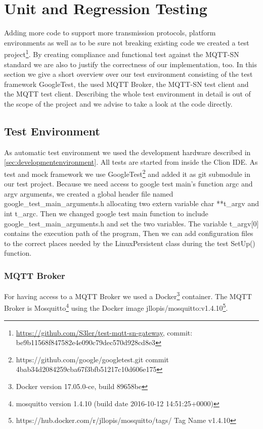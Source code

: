 \section{Unit and Regression Testing}\label{sec:unitandregressiontesting}
Adding more code to support more transmission protocols, platform environments as well as to be sure not breaking existing code we created a test project\footnote{\url{https://github.com/S3ler/test-mqtt-sn-gateway}, commit: be9b11568f847582e4e090c79dec570d928cd8e3}. By creating compliance and functional test against the MQTT-SN standard we are also to justify the correctness of our implementation, too.
In this section we give a short overview over our test environment consisting of the test framework GoogleTest, the used MQTT Broker, the MQTT-SN test client and the MQTT test client.
Describing the whole test environment in detail is out of the scope of the project and we advise to take a look at the code directly.
\subsection{Test Environment}\label{sec:testenvironment}
As automatic test environment we used the development hardware described in \autoref{sec:developmentenvironment}.
All tests are started from inside the Clion IDE.
As test and mock framework we use GoogleTest\footnote{https://github.com/google/googletest.git commit 4bab34d2084259cba67f3bfb51217c10d606e175} and added it as git submodule in our test project.
Because we need access to google test main's function argc and argv arguments, we created a global header file named google\_test\_main\_arguments.h allocating two extern variable char **t\_argv and int t\_argc.
Then we changed google test main function to include google\_test\_main\_arguments.h and set the two variables. 
The variable t\_argv[0] contains the execution path of the program,
Then we can add configuration files to the correct places needed by the LinuxPersistent class during the test SetUp() function.
\subsubsection{MQTT Broker}
For having access to a MQTT Broker we used a Docker\footnote{Docker version 17.05.0-ce, build 89658be} container. The MQTT Broker is Mosquitto\footnote{mosquitto version 1.4.10 (build date 2016-10-12 14:51:25+0000)} using the Docker image jllopis/mosquitto:v1.4.10\footnote{ https://hub.docker.com/r/jllopis/mosquitto/tags/ Tag Name v1.4.10}.
